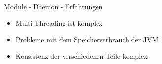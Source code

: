 

\begin{frame}{Module - Daemon - Erfahrungen}
	\begin{itemize}
		\item Multi-Threading ist komplex
		\item Probleme mit dem Speicherverbrauch der JVM
		\item Konsistenz der verschiedenen Teile komplex
	\end{itemize}
\end{frame}
